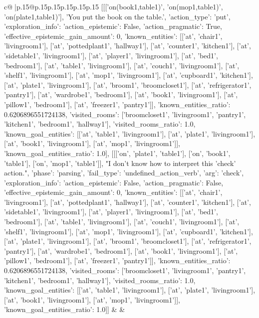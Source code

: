 \documentclass{article}
\begin{document}
{\begin{supertabular}{c@{$\;$}|p{.15\linewidth}@{}p{.15\linewidth}p{.15\linewidth}p{.15\linewidth}p{.15\linewidth}p{.15\linewidth}}
{{{	 [[['on(book1,table1)', 'on(mop1,table1)', 'on(plate1,table1)'], 'You put the book on the table.', {'action_type': 'put', 'exploration_info': {'action_epistemic': False, 'action_pragmatic': True, 'effective_epistemic_gain_amount': 0, 'known_entities': [['at', 'chair1', 'livingroom1'], ['at', 'pottedplant1', 'hallway1'], ['at', 'counter1', 'kitchen1'], ['at', 'sidetable1', 'livingroom1'], ['at', 'player1', 'livingroom1'], ['at', 'bed1', 'bedroom1'], ['at', 'table1', 'livingroom1'], ['at', 'couch1', 'livingroom1'], ['at', 'shelf1', 'livingroom1'], ['at', 'mop1', 'livingroom1'], ['at', 'cupboard1', 'kitchen1'], ['at', 'plate1', 'livingroom1'], ['at', 'broom1', 'broomcloset1'], ['at', 'refrigerator1', 'pantry1'], ['at', 'wardrobe1', 'bedroom1'], ['at', 'book1', 'livingroom1'], ['at', 'pillow1', 'bedroom1'], ['at', 'freezer1', 'pantry1']], 'known_entities_ratio': 0.6206896551724138, 'visited_rooms': ['broomcloset1', 'livingroom1', 'pantry1', 'kitchen1', 'bedroom1', 'hallway1'], 'visited_rooms_ratio': 1.0, 'known_goal_entities': [['at', 'table1', 'livingroom1'], ['at', 'plate1', 'livingroom1'], ['at', 'book1', 'livingroom1'], ['at', 'mop1', 'livingroom1']], 'known_goal_entities_ratio': 1.0}}], [[['on', 'plate1', 'table1'], ['on', 'book1', 'table1'], ['on', 'mop1', 'table1']], "I don't know how to interpret this 'check' action.", {'phase': 'parsing', 'fail_type': 'undefined_action_verb', 'arg': 'check', 'exploration_info': {'action_epistemic': False, 'action_pragmatic': False, 'effective_epistemic_gain_amount': 0, 'known_entities': [['at', 'chair1', 'livingroom1'], ['at', 'pottedplant1', 'hallway1'], ['at', 'counter1', 'kitchen1'], ['at', 'sidetable1', 'livingroom1'], ['at', 'player1', 'livingroom1'], ['at', 'bed1', 'bedroom1'], ['at', 'table1', 'livingroom1'], ['at', 'couch1', 'livingroom1'], ['at', 'shelf1', 'livingroom1'], ['at', 'mop1', 'livingroom1'], ['at', 'cupboard1', 'kitchen1'], ['at', 'plate1', 'livingroom1'], ['at', 'broom1', 'broomcloset1'], ['at', 'refrigerator1', 'pantry1'], ['at', 'wardrobe1', 'bedroom1'], ['at', 'book1', 'livingroom1'], ['at', 'pillow1', 'bedroom1'], ['at', 'freezer1', 'pantry1']], 'known_entities_ratio': 0.6206896551724138, 'visited_rooms': ['broomcloset1', 'livingroom1', 'pantry1', 'kitchen1', 'bedroom1', 'hallway1'], 'visited_rooms_ratio': 1.0, 'known_goal_entities': [['at', 'table1', 'livingroom1'], ['at', 'plate1', 'livingroom1'], ['at', 'book1', 'livingroom1'], ['at', 'mop1', 'livingroom1']], 'known_goal_entities_ratio': 1.0}}]] 
	  } 
	   } 
	   } 
	 & & \\ 
 


\end{supertabular}}
\end{document}
